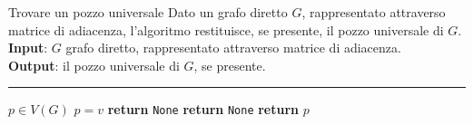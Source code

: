 \documentclass[a4paper, 12pt]{report}
\begin{document}
    \begin{framedalgo}{Trovare un pozzo universale}
        Dato un grafo diretto $G$, rappresentato attraverso matrice di adiacenza, l'algoritmo restituisce, se presente, il pozzo universale di $G$.\\
        \textbf{Input}: $G$ grafo diretto, rappresentato attraverso matrice di adiacenza.\\
        \textbf{Output}: il pozzo universale di $G$, se presente.

        \hrule
        \begin{algorithmic}[1]
                \State $p \in V(G)$ 
                        \State $p = v$
                    \EndIf
                \EndFor
                        \State \textbf{return} \texttt{None}
                    \EndIf
                        \State \textbf{return} \texttt{None}
                    \EndIf
                \EndFor
                \State \textbf{return} $p$
            \EndFunction
        \end{algorithmic}
    \end{framedalgo}
\end{document}
